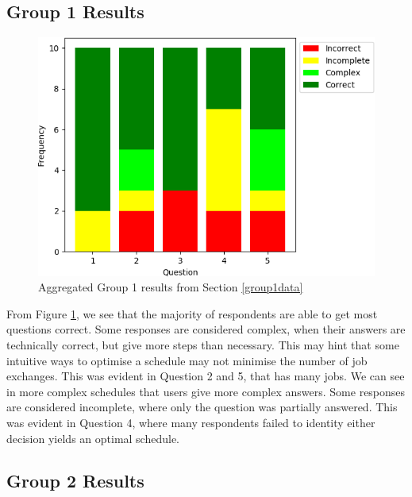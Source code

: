 \subsection{Group 1 Results}

\begin{figure}[H]
	\begin{center}
		\includegraphics[scale=0.55]{figures/questionnaire_results_group_one}
	\end{center}
	\caption{Aggregated Group 1 results from Section \ref{group1data}}
	\label{group1chart}
\end{figure}

From Figure \ref{group1chart}, we see that the majority of respondents are able to get most questions correct. Some responses are considered complex, when their answers are technically correct, but give more steps than necessary. This may hint that some intuitive ways to optimise a schedule may not minimise the number of job exchanges. This was evident in Question 2 and 5, that has many jobs. We can see in more complex schedules that users give more complex answers. Some responses are considered incomplete, where only the question was partially answered. This was evident in Question 4, where many respondents failed to identity either decision yields an optimal schedule.

\subsection{Group 2 Results}

